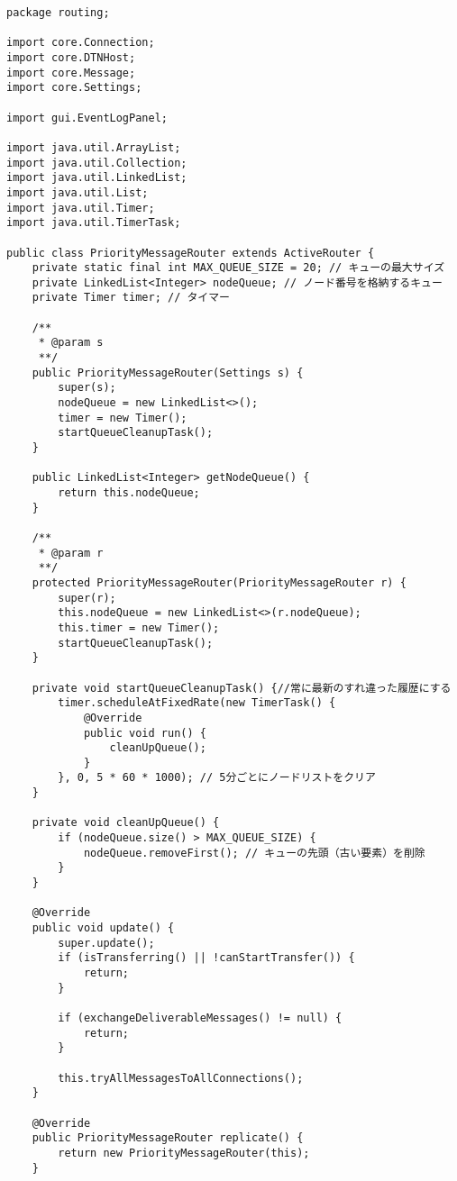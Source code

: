 \documentclass[11pt]{icsthesis}
\begin{document}
\begin{framed}
\begin{verbatim}
package routing;

import core.Connection;
import core.DTNHost;
import core.Message;
import core.Settings;

import gui.EventLogPanel;

import java.util.ArrayList;
import java.util.Collection;
import java.util.LinkedList;
import java.util.List;
import java.util.Timer;
import java.util.TimerTask;

public class PriorityMessageRouter extends ActiveRouter {
    private static final int MAX_QUEUE_SIZE = 20; // キューの最大サイズ
    private LinkedList<Integer> nodeQueue; // ノード番号を格納するキュー
    private Timer timer; // タイマー

    /**
     * @param s
     **/
    public PriorityMessageRouter(Settings s) {
        super(s);
        nodeQueue = new LinkedList<>();
        timer = new Timer();
        startQueueCleanupTask();
    }

    public LinkedList<Integer> getNodeQueue() {
        return this.nodeQueue;
    }

    /**
     * @param r
     **/
    protected PriorityMessageRouter(PriorityMessageRouter r) {
        super(r);
        this.nodeQueue = new LinkedList<>(r.nodeQueue);
        this.timer = new Timer();
        startQueueCleanupTask();
    }

    private void startQueueCleanupTask() {//常に最新のすれ違った履歴にする
        timer.scheduleAtFixedRate(new TimerTask() {
            @Override
            public void run() {
                cleanUpQueue();
            }
        }, 0, 5 * 60 * 1000); // 5分ごとにノードリストをクリア
    }

    private void cleanUpQueue() {
        if (nodeQueue.size() > MAX_QUEUE_SIZE) {
            nodeQueue.removeFirst(); // キューの先頭（古い要素）を削除
        }
    }

    @Override
    public void update() {
        super.update();
        if (isTransferring() || !canStartTransfer()) {
            return;
        }

        if (exchangeDeliverableMessages() != null) {
            return;
        }

        this.tryAllMessagesToAllConnections();
    }

    @Override
    public PriorityMessageRouter replicate() {
        return new PriorityMessageRouter(this);
    }


\end{verbatim}
\end{framed}
\end{document}
